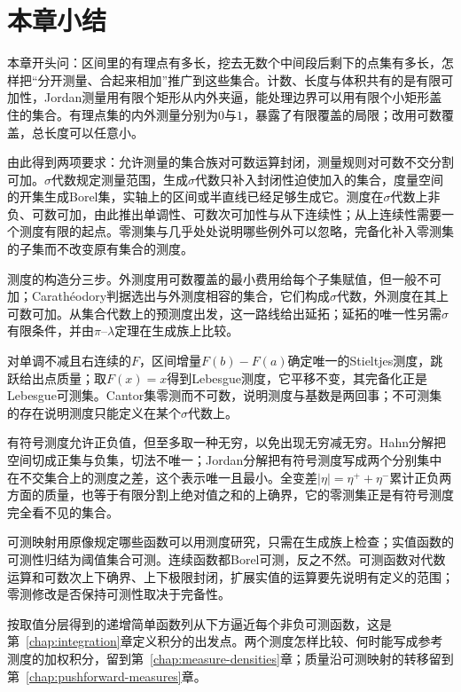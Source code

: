 \section{本章小结}
\label{sec:meas-summary}

本章开头问：区间里的有理点有多长，挖去无数个中间段后剩下的点集有多长，怎样把“分开测量、合起来相加”推广到这些集合。计数、长度与体积共有的是有限可加性，Jordan测量用有限个矩形从内外夹逼，能处理边界可以用有限个小矩形盖住的集合。有理点集的内外测量分别为$0$与$1$，暴露了有限覆盖的局限；改用可数覆盖，总长度可以任意小。

由此得到两项要求：允许测量的集合族对可数运算封闭，测量规则对可数不交分割可加。$\sigma$代数规定测量范围，生成$\sigma$代数只补入封闭性迫使加入的集合，度量空间的开集生成Borel集，实轴上的区间或半直线已经足够生成它。测度在$\sigma$代数上非负、可数可加，由此推出单调性、可数次可加性与从下连续性；从上连续性需要一个测度有限的起点。零测集与几乎处处说明哪些例外可以忽略，完备化补入零测集的子集而不改变原有集合的测度。

测度的构造分三步。外测度用可数覆盖的最小费用给每个子集赋值，但一般不可加；Carathéodory判据选出与外测度相容的集合，它们构成$\sigma$代数，外测度在其上可数可加。从集合代数上的预测度出发，这一路线给出延拓；延拓的唯一性另需$\sigma$有限条件，并由$\pi$--$\lambda$定理在生成族上比较。

对单调不减且右连续的$F$，区间增量$F(b)-F(a)$确定唯一的Stieltjes测度，跳跃给出点质量；取$F(x)=x$得到Lebesgue测度，它平移不变，其完备化正是Lebesgue可测集。Cantor集零测而不可数，说明测度与基数是两回事；不可测集的存在说明测度只能定义在某个$\sigma$代数上。

有符号测度允许正负值，但至多取一种无穷，以免出现无穷减无穷。Hahn分解把空间切成正集与负集，切法不唯一；Jordan分解把有符号测度写成两个分别集中在不交集合上的测度之差，这个表示唯一且最小。全变差$\lvert\eta\rvert=\eta^++\eta^-$累计正负两方面的质量，也等于有限分割上绝对值之和的上确界，它的零测集正是有符号测度完全看不见的集合。

可测映射用原像规定哪些函数可以用测度研究，只需在生成族上检查；实值函数的可测性归结为阈值集合可测。连续函数都Borel可测，反之不然。可测函数对代数运算和可数次上下确界、上下极限封闭，扩展实值的运算要先说明有定义的范围；零测修改是否保持可测性取决于完备性。

按取值分层得到的递增简单函数列从下方逼近每个非负可测函数，这是第~\ref{chap:integration}章定义积分的出发点。两个测度怎样比较、何时能写成参考测度的加权积分，留到第~\ref{chap:measure-densities}章；质量沿可测映射的转移留到第~\ref{chap:pushforward-measures}章。
